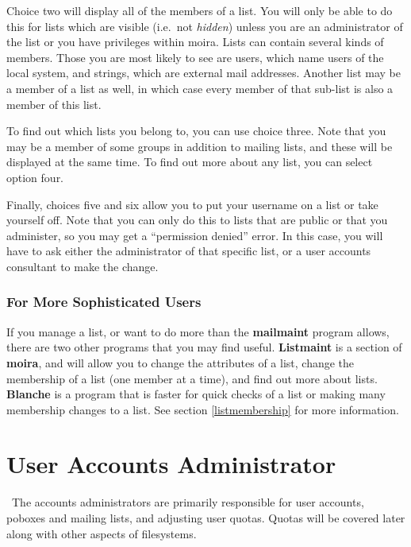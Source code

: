 Choice two will display all of the members of a list.  You will only
be able to do this for lists which are visible (i.e.\ not {\em hidden})
unless you are an administrator of the list or you have privileges
within moira.  Lists can contain several kinds of members.  Those you
are most likely to see are users, which name users of the local
system, and strings, which are external mail addresses.  Another list
may be a member of a list as well, in which case every member of that
sub-list is also a member of this list.

To find out which lists you belong to, you can use choice three.  Note
that you may be a member of some groups in addition to mailing lists,
and these will be displayed at the same time.  To find out more about
any list, you can select option four.

Finally, choices five and six allow you to put your username on a list
or take yourself off.  Note that you can only do this to lists that
are public or that you administer, so you may get a ``permission
denied'' error.  In this case, you will have to ask either the
administrator of that specific list, or a user accounts consultant to
make the change.

\subsection{For More Sophisticated Users}

If you manage a list, or want to do more than the {\bf mailmaint}
program allows, there are two other programs that you may find useful.
 {\bf Listmaint} is a section of {\bf moira}, and will
allow you to change the attributes of a list, change the membership of
a list (one member at a time), and find out more about lists.
 {\bf Blanche} is a program that is faster for quick
checks of a list or making many membership changes to a list.  See
section \ref{listmembership} for more information.

\chapter{User Accounts Administrator}

\athena\ The accounts administrators are primarily responsible for
user accounts, poboxes and mailing lists, and adjusting user quotas.
Quotas will be covered later along with other aspects of filesystems.

